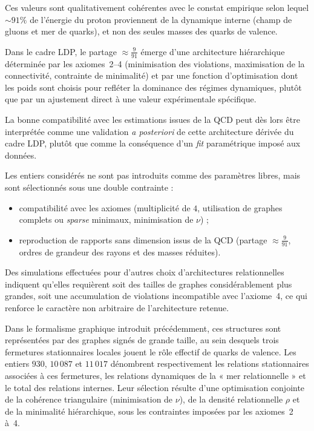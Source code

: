\documentclass[11pt,a4paper]{article}
\begin{document}
Ces valeurs sont qualitativement cohérentes avec le constat empirique selon lequel \(\sim 91\%\) de l’énergie du proton proviennent de la dynamique interne (champ de gluons et mer de quarks), et non des seules masses des quarks de valence. 

Dans le cadre LDP, le partage \(\approx \frac{9}{91}\) émerge d’une architecture hiérarchique déterminée par les axiomes~2–4 (minimisation des violations, maximisation de la connectivité, contrainte de minimalité) et par une fonction d’optimisation dont les poids sont choisis pour refléter la dominance des régimes dynamiques, plutôt que par un ajustement direct à une valeur expérimentale spécifique.

La bonne compatibilité avec les estimations issues de la QCD peut dès lors être interprétée comme une validation \emph{a posteriori} de cette architecture dérivée du cadre LDP, plutôt que comme la conséquence d’un \emph{fit} paramétrique imposé aux données. 

Les entiers considérés ne sont pas introduits comme des paramètres libres, mais sont sélectionnés sous une double contrainte :
\begin{itemize}
  \item compatibilité avec les axiomes (multiplicité de \(4\), utilisation de graphes complets ou \emph{sparse} minimaux, minimisation de \(\nu\)) ;
  \item reproduction de rapports sans dimension issus de la QCD (partage \(\approx \frac{9}{91}\), ordres de grandeur des rayons et des masses réduites).
\end{itemize}

Des simulations effectuées pour d’autres choix d’architectures relationnelles indiquent qu’elles requièrent soit des tailles de graphes considérablement plus grandes, soit une accumulation de violations incompatible avec l’axiome~4, ce qui renforce le caractère non arbitraire de l’architecture retenue.

Dans le formalisme graphique introduit précédemment, ces structures sont représentées par des graphes signés de grande taille, au sein desquels trois fermetures stationnaires locales jouent le rôle effectif de quarks de valence. Les entiers \(930\), \(10\,087\) et \(11\,017\) dénombrent respectivement les relations stationnaires associées à ces fermetures, les relations dynamiques de la « mer relationnelle » et le total des relations internes. Leur sélection résulte d’une optimisation conjointe de la cohérence triangulaire (minimisation de \(\nu\)), de la densité relationnelle \(\rho\) et de la minimalité hiérarchique, sous les contraintes imposées par les axiomes~2 à~4.
\end{document}
